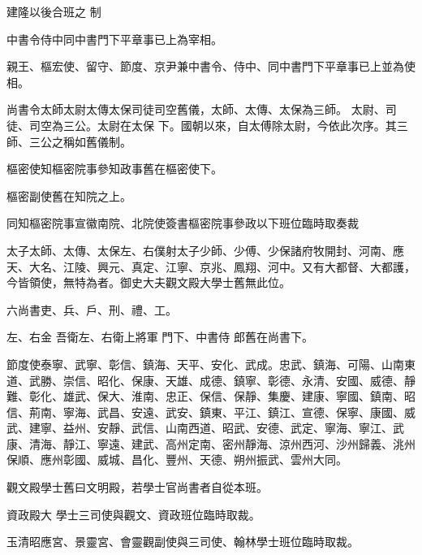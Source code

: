 
\begin{pinyinscope}

 建隆以後合班之
 制



 中書令侍中同中書門下平章事已上為宰相。



 親王、樞宏使、留守、節度、京尹兼中書令、侍中、同中書門下平章事已上並為使相。



 尚書令太師太尉太傳太保司徒司空舊儀，太師、太傳、太保為三師。
 太尉、司徒、司空為三公。太尉在太保
 下。國朝以來，自太傅除太尉，今依此次序。其三師、三公之稱如舊儀制。



 樞密使知樞密院事參知政事舊在樞密使下。



 樞密副使舊在知院之上。



 同知樞密院事宣徽南院、北院使簽書樞密院事參政以下班位臨時取奏裁



 太子太師、太傳、太保左、右僕射太子少師、少傅、少保諸府牧開封、河南、應天、大名、江陵、興元、真定、江寧、京兆、鳳翔、河中。又有大都督、大都護，今皆領使，無特為者。御史大夫觀文殿大學士舊無此位。



 六尚書吏、兵、戶、刑、禮、工。



 左、右金
 吾衛左、右衛上將軍
 門下、中書侍
 郎舊在尚書下。



 節度使泰寧、武寧、彰信、鎮海、天平、安化、武成。忠武、鎮海、可陽、山南東道、武勝、崇信、昭化、保康、天雄、成德、鎮寧、彰德、永清、安國、威德、靜難、彰化、雄武、保大、淮南、忠正、保信、保靜、集慶、建康、寧國、鎮南、昭信、荊南、寧海、武昌、安遠、武安、鎮東、平江、鎮江、宣德、保寧、康國、威武、建寧、益州、安靜、武信、山南西道、昭武、安德、武定、寧海、寧江、武康、清海、靜江、寧遠、建武、高州定南、密州靜海、涼州西河、沙州歸義、洮州保順、應州彰國、威城、昌化、豐州、天德、朔州振武、雲州大同。



 觀文殿學士舊曰文明殿，若學士官尚書者自從本班。



 資政殿大
 學士三司使與觀文、資政班位臨時取裁。



 玉清昭應宮、景靈宮、會靈觀副使與三司使、翰林學士班位臨時取裁。




\end{pinyinscope}
